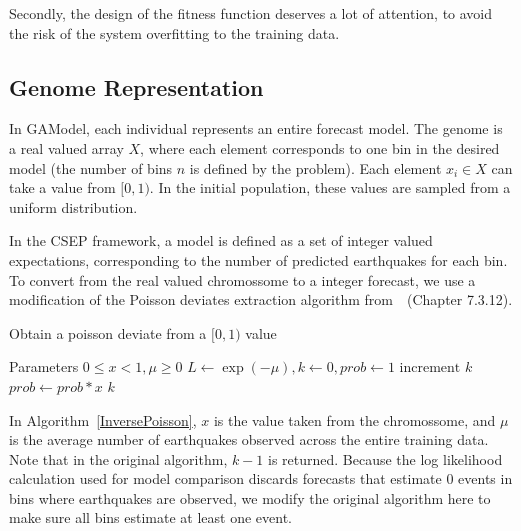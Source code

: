 \documentclass{sig-alternate}
\begin{document}
Secondly, the design of the fitness function deserves a lot of
attention, to avoid the risk of the system overfitting to the training
data.

\subsection{Genome Representation} %


In GAModel, each individual represents an entire forecast model. The
genome is a real valued array $X$, where each element corresponds to
one bin in the desired model (the number of bins $n$ is defined by the
problem). Each element $x_i \in X$ can take a value from $[0,1)$. In
  the initial population, these values are sampled from a uniform
  distribution.

In the CSEP framework, a model is defined as a set of integer valued
expectations, corresponding to the number of predicted earthquakes for
each bin. To convert from the real valued chromossome to a integer
forecast, we use a modification of the Poisson deviates extraction
algorithm from~\cite{NumericalRecipes}~(Chapter 7.3.12).

\begin{algorithm}
  \caption{Obtain a poisson deviate from a $[0,1)$ value}
  \label{InversePoisson}
  \begin{algorithmic}
    \STATE Parameters $0 \leq x < 1, \mu \geq 0$
    \STATE $L \gets \exp{(-\mu)}, k \gets 0, prob \gets 1$
    \REPEAT 
    \STATE $\text{increment }k$
    \STATE $prob \gets prob*x$
    \RETURN $k$
  \end{algorithmic}
\end{algorithm}

In Algorithm~\ref{InversePoisson}, $x$ is the value taken from the
chromossome, and $\mu$ is the average number of earthquakes observed
across the entire training data. Note that in the original algorithm,
$k-1$ is returned. Because the log likelihood calculation used for
model comparison discards forecasts that estimate $0$ events in bins
where earthquakes are observed, we modify the original algorithm here
to make sure all bins estimate at least one event.

\end{document}
